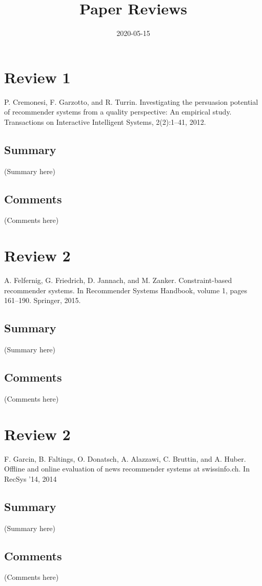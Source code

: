 \documentclass{article}
\begin{document}
\title{Paper Reviews}
\date{2020-05-15}
\maketitle

\section*{Review 1}
P. Cremonesi, F. Garzotto, and R. Turrin. Investigating the persuasion
potential of recommender systems from a quality perspective: An empirical
study. Transactions on Interactive Intelligent Systems, 2(2):1–41, 2012.

\subsection*{Summary}
(Summary here)

\subsection*{Comments}
(Comments here)


\section*{Review 2}
A. Felfernig, G. Friedrich, D. Jannach, and M. Zanker. Constraint-based
recommender systems. In Recommender Systems Handbook, volume 1,
pages 161–190. Springer, 2015.

\subsection*{Summary}
(Summary here)

\subsection*{Comments}
(Comments here)


\section*{Review 2}
F. Garcin, B. Faltings, O. Donatsch, A. Alazzawi, C. Bruttin, and A. Huber.
Offline and online evaluation of news recommender systems at swissinfo.ch.
In RecSys ’14, 2014

\subsection*{Summary}
(Summary here)

\subsection*{Comments}
(Comments here)
\end{document}
